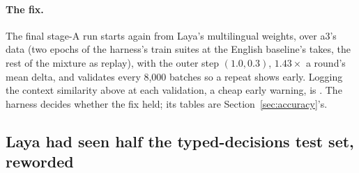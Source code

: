 \paragraph{The fix.}
The final stage-A run starts again from Laya's multilingual weights, over a3's
data (two epochs of the harness's train suites at the English baseline's takes,
the rest of the mixture as replay), with the outer step $(1.0, 0.3)$,
$1.43\times$ a round's mean delta, and validates every 8{,}000 batches so a
repeat shows early. Logging the context similarity above at each validation, a
cheap early warning, is \proposed. The harness decides whether the fix held;
its tables are Section~\ref{sec:accuracy}'s.

\subsection{Laya had seen half the typed-decisions test set, reworded}
\label{sec:overlap}

